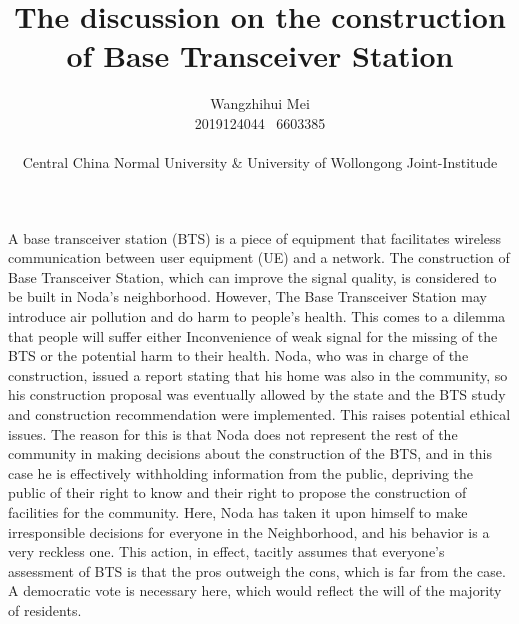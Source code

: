\documentclass[a4paper,11pt]{article}
\begin{document}
\title{The discussion on the construction of Base Transceiver Station}
\author{Wangzhihui Mei \\ 2019124044 \ 6603385
\\ \\
Central China Normal University \& 
University of Wollongong Joint-Institude}


\date{}

\maketitle
\thispagestyle{empty}
\clearpage
A base transceiver station (BTS) is a piece of equipment that facilitates wireless communication between user equipment (UE) and a network. The construction of Base Transceiver Station, which can improve the signal quality, is considered to be built in Noda's neighborhood. However, The Base Transceiver Station may introduce air pollution and do harm to people's health. This comes to a dilemma that people will suffer either Inconvenience of weak signal for the missing of the BTS or the potential harm to their health. Noda, who was in charge of the construction, issued a report stating that his home was also in the community, so his construction proposal was eventually allowed by the state and the BTS study and construction recommendation were implemented. This raises potential ethical issues. The reason for this is that Noda does not represent the rest of the community in making decisions about the construction of the BTS, and in this case he is effectively withholding information from the public, depriving the public of their right to know and their right to propose the construction of facilities for the community. Here, Noda has taken it upon himself to make irresponsible decisions for everyone in the Neighborhood, and his behavior is a very reckless one. This action, in effect, tacitly assumes that everyone's assessment of BTS is that the pros outweigh the cons, which is far from the case. A democratic vote is necessary here, which would reflect the will of the majority of residents.
\end{document}
